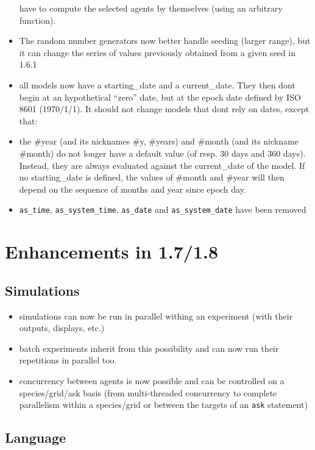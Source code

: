\documentclass[]{book}
\providecommand{\tightlist}{%
  \setlength{\itemsep}{0pt}\setlength{\parskip}{0pt}}
\theoremstyle{definition}
\theoremstyle{definition}
\theoremstyle{definition}
\theoremstyle{remark}
\begin{document}
\begin{itemize}
  have to compute the selected agents by themselves (using an arbitrary
  function).
\item
  The random number generators now better handle seeding (larger range),
  but it can change the series of values previously obtained from a
  given seed in 1.6.1
\item
  all models now have a starting\_date and a current\_date. They then
  dont begin at an hypothetical ``zero'' date, but at the epoch date
  defined by ISO 8601 (1970/1/1). It should not change models that dont
  rely on dates, except that:
\item
  the \#year (and its nicknames \#y, \#years) and \#month (and its
  nickname \#month) do not longer have a default value (of resp. 30 days
  and 360 days). Instead, they are always evaluated against the
  current\_date of the model. If no starting\_date is defined, the
  values of \#month and \#year will then depend on the sequence of
  months and year since epoch day.
\item
  \texttt{as\_time}, \texttt{as\_system\_time}, \texttt{as\_date} and
  \texttt{as\_system\_date} have been removed
\end{itemize}

\chapter{Enhancements in 1.7/1.8}\label{enhancements-in-1.71.8}

\section{Simulations}\label{simulations}

\begin{itemize}
\tightlist
\item
  simulations can now be run in parallel withing an experiment (with
  their outputs, displays, etc.)
\item
  batch experiments inherit from this possibility and can now run their
  repetitions in parallel too.
\item
  concurrency between agents is now possible and can be controlled on a
  species/grid/ask basis (from multi-threaded concurrency to complete
  parallelism within a species/grid or between the targets of an
  \texttt{ask} statement)
\end{itemize}

\section{Language}\label{language}
\end{document}

